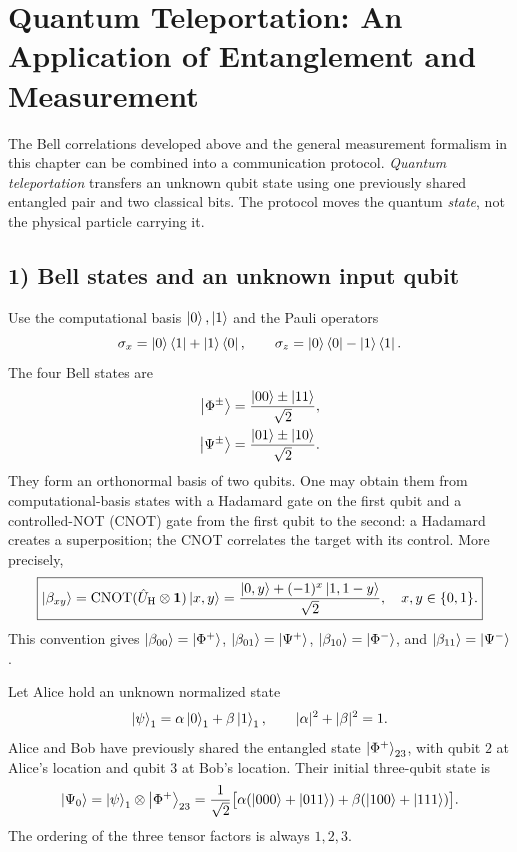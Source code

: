 \section{Quantum Teleportation: An Application of Entanglement and Measurement}

The Bell correlations developed above and the general measurement formalism in this chapter can be combined into a communication protocol. \emph{Quantum teleportation} transfers an unknown qubit state using one previously shared entangled pair and two classical bits. The protocol moves the quantum \emph{state}, not the physical particle carrying it.

\subsection*{1) Bell states and an unknown input qubit}

Use the computational basis $\left|0\right\rangle,\left|1\right\rangle$ and the Pauli operators
\begin{equation}
\sigma_x=\left|0\right\rangle\left\langle1\right|+\left|1\right\rangle\left\langle0\right|,\qquad
  \sigma_z=\left|0\right\rangle\left\langle0\right|-\left|1\right\rangle\left\langle1\right|.
\end{equation}
The four Bell states are
\begin{equation}
\begin{aligned}
\left|\Phi^\pm\right\rangle&=\frac{\left|00\right\rangle\pm\left|11\right\rangle}{\sqrt2},\\
\left|\Psi^\pm\right\rangle&=\frac{\left|01\right\rangle\pm\left|10\right\rangle}{\sqrt2}.
\end{aligned}
\end{equation}
They form an orthonormal basis of two qubits. One may obtain them from computational-basis states with a Hadamard gate on the first qubit and a controlled-NOT (CNOT) gate from the first qubit to the second: a Hadamard creates a superposition; the CNOT correlates the target with its control. More precisely,
\begin{equation}
\boxed{\left|\beta_{xy}\right\rangle=\operatorname{CNOT}(\hat{U}_{\mathrm H}\otimes\mathbf1)\left|x,y\right\rangle
=\frac{\left|0,y\right\rangle+(-1)^x\left|1,1-y\right\rangle}{\sqrt2},\quad x,y\in\{0,1\}.}
\end{equation}
This convention gives $\left|\beta_{00}\right\rangle=\left|\Phi^+\right\rangle$, $\left|\beta_{01}\right\rangle=\left|\Psi^+\right\rangle$, $\left|\beta_{10}\right\rangle=\left|\Phi^-\right\rangle$, and $\left|\beta_{11}\right\rangle=\left|\Psi^-\right\rangle$.

Let Alice hold an unknown normalized state
\begin{equation}
\left|\psi\right\rangle_1=\alpha\left|0\right\rangle_1+\beta\left|1\right\rangle_1,
\qquad|\alpha|^2+|\beta|^2=1.
\end{equation}
Alice and Bob have previously shared the entangled state $\left|\Phi^+\right\rangle_{23}$, with qubit $2$ at Alice's location and qubit $3$ at Bob's location. Their initial three-qubit state is
\begin{equation}
\left|\Psi_0\right\rangle=\left|\psi\right\rangle_1\otimes\left|\Phi^+\right\rangle_{23}
=\frac1{\sqrt2}\bigl[\alpha(\left|000\right\rangle+\left|011\right\rangle)
   +\beta(\left|100\right\rangle+\left|111\right\rangle)\bigr].
\end{equation}
The ordering of the three tensor factors is always $1,2,3$.

